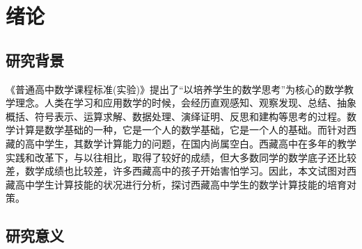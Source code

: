 \chapter{绪论}


\section{研究背景}


《普通高中数学课程标准(实验)》提出了“以培养学生的数学思考”为核心的数学教学理念\cite{教育部全日制义务教育数学课程标准}。人类在学习和应用数学的时候，会经历直观感知、观察发现、总结、抽象概括、符号表示、运算求解、数据处理、演绎证明、反思和建构等思考的过程\cite{李明杰2009高中数学课堂学生能力培养的策略研究}。数学计算是数学基础的一种，它是一个人的数学基础，它是一个人的基础。而针对西藏的高中学生，其数学计算能力的问题，在国内尚属空白。西藏高中在多年的教学实践和改革下，与以往相比，取得了较好的成绩，但大多数同学的数学底子还比较差，数学成绩也比较差，许多西藏高中的孩子开始害怕学习。因此，本文试图对西藏高中学生计算技能的状况进行分析，探讨西藏高中学生的数学计算技能的培育对策。



\section{研究意义}


